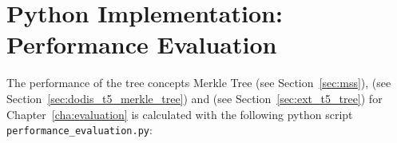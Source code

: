 \chapter{Python Implementation: Performance Evaluation}
\label{cha:appendix2_performance_calc}

The performance of the tree concepts Merkle Tree (see Section~\ref{sec:mss}), \tftree (see Section~\ref{sec:dodis_t5_merkle_tree}) and \extree (see Section~\ref{sec:ext_t5_tree}) for Chapter~\ref{cha:evaluation} is calculated with the following python script \texttt{performance_evaluation.py}:

\inputminted[breaklines,linenos]{python}{scripts/performance_evaluation.py}